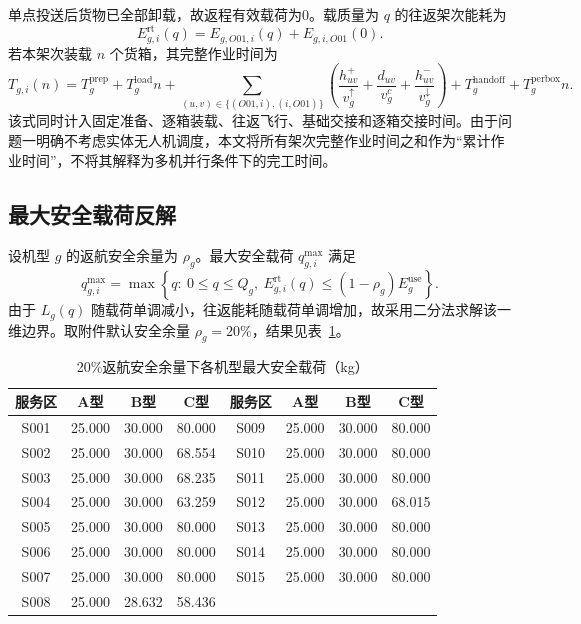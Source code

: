 单点投送后货物已全部卸载，故返程有效载荷为0。载质量为 $q$ 的往返架次能耗为
\begin{equation}
E_{g,i}^{\mathrm{rt}}(q)=E_{g,O01,i}(q)+E_{g,i,O01}(0).
\end{equation}
若本架次装载 $n$ 个货箱，其完整作业时间为
\begin{equation}
T_{g,i}(n)=T_g^{\mathrm{prep}}+T_g^{\mathrm{load}}n
+\sum_{(u,v)\in\{(O01,i),(i,O01)\}}
\left(\frac{h_{uv}^{+}}{v_g^{\uparrow}}+\frac{d_{uv}}{v_g^c}+\frac{h_{uv}^{-}}{v_g^{\downarrow}}\right)
+T_g^{\mathrm{handoff}}+T_g^{\mathrm{perbox}}n.
\end{equation}
该式同时计入固定准备、逐箱装载、往返飞行、基础交接和逐箱交接时间。由于问题一明确不考虑实体无人机调度，本文将所有架次完整作业时间之和作为“累计作业时间”，不将其解释为多机并行条件下的完工时间。

\subsection{最大安全载荷反解}

设机型 $g$ 的返航安全余量为 $\rho_g$。最大安全载荷 $q_{g,i}^{\max}$ 满足
\begin{equation}
q_{g,i}^{\max}=\max\left\{q:\ 0\le q\le Q_g,
\ E_{g,i}^{\mathrm{rt}}(q)\le(1-\rho_g)E_g^{\mathrm{use}}\right\}.
\end{equation}
由于 $L_g(q)$ 随载荷单调减小，往返能耗随载荷单调增加，故采用二分法求解该一维边界。取附件默认安全余量 $\rho_g=20\%$，结果见表~\ref{tab:q1-payload}。

\begin{table}[htbp]
\centering
\caption{20\%返航安全余量下各机型最大安全载荷（kg）}
\label{tab:q1-payload}
\small
\begin{tabular}{cccccccc}
\toprule
服务区 & A型 & B型 & C型 & 服务区 & A型 & B型 & C型\\
\midrule
S001 & 25.000 & 30.000 & 80.000 & S009 & 25.000 & 30.000 & 80.000\\
S002 & 25.000 & 30.000 & 68.554 & S010 & 25.000 & 30.000 & 80.000\\
S003 & 25.000 & 30.000 & 68.235 & S011 & 25.000 & 30.000 & 80.000\\
S004 & 25.000 & 30.000 & 63.259 & S012 & 25.000 & 30.000 & 68.015\\
S005 & 25.000 & 30.000 & 80.000 & S013 & 25.000 & 30.000 & 80.000\\
S006 & 25.000 & 30.000 & 80.000 & S014 & 25.000 & 30.000 & 80.000\\
S007 & 25.000 & 30.000 & 80.000 & S015 & 25.000 & 30.000 & 80.000\\
S008 & 25.000 & 28.632 & 58.436 & & & &\\
\bottomrule
\end{tabular}
\end{table}

